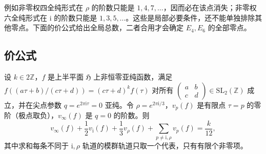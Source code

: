 例如非零权四全纯形式在 \(\rho\) 的阶数只能是 \(1,4,7,\ldots\)，因而必在该点消失；非零权六全纯形式在 \(\mathrm{i}\) 的阶数只能是 \(1,3,5,\ldots\)。这些是局部必要条件，还不能单独排除其他零点。下面的价公式给出全局总数，二者合用才会确定 \(E_4,E_6\) 的全部零点。

\subsection{价公式}
\label{b3:subsec:230502}

\begin{theorem}[价公式]\label{b3:thm:23-valence}
设 \(k\in2\mathbb Z\)，\(f\) 是上半平面 \(\mathfrak H\) 上非恒零亚纯函数，满足 \(f((a\tau+b)/(c\tau+d))=(c\tau+d)^kf(\tau)\) 对所有 \(\left(\begin{smallmatrix}a&b\\c&d\end{smallmatrix}\right)\in\mathrm{SL}_2(\mathbb Z)\) 成立，并在尖点参数 \(q=e^{2\pi\mathrm i\tau}=0\) 亚纯。令 \(\rho=e^{2\pi\mathrm i/3}\)，\(v_p(f)\) 是有限点 \(\tau=p\) 的零阶（极点取负），\(v_\infty(f)\) 是 \(q=0\) 的阶数。则
\[
v_\infty(f)+\frac12v_{\mathrm{i}}(f)+\frac13v_\rho(f)
+\sum_{p\ne\mathrm{i},\rho}v_p(f)=\frac{k}{12},
\]
其中求和每条不同于 \(\mathrm{i},\rho\) 轨道的模群轨道只取一个代表，只有有限个非零项。
\end{theorem}
